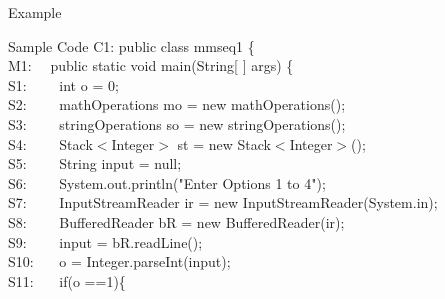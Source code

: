 		\begin{tframe}{Example}
             \begin{block}{Sample Code}
						{\footnotesize
C1: public class mmseq1 \{\\
M1:	\ \ public static void main(String[ ] args) \{\\
S1:	\ \ \ \ 	int o = 0;\\
S2:	\ \ \ \ 	mathOperations mo = new mathOperations();\\
S3:	\ \ \ \ 	stringOperations so = new stringOperations();\\
S4:	\ \ \ \ 	Stack$<$Integer$>$ st = new Stack$<$Integer$>$();\\
S5:	\ \ \ \ 	String input = null;\\
S6:	\ \ \ \ 	System.out.println("Enter Options 1 to 4");\\
S7:	\ \ \ \ 	InputStreamReader ir = new InputStreamReader(System.in);\\
S8:	\ \ \ \ 	BufferedReader bR = new BufferedReader(ir);\\
S9: \	\ \ \ 	input = bR.readLine();\\
S10:	\ \ \ 	o = Integer.parseInt(input);\\
S11:	\ \ \ 	if(o ==1)\{
 }
             \end{block}
		\end{tframe}
